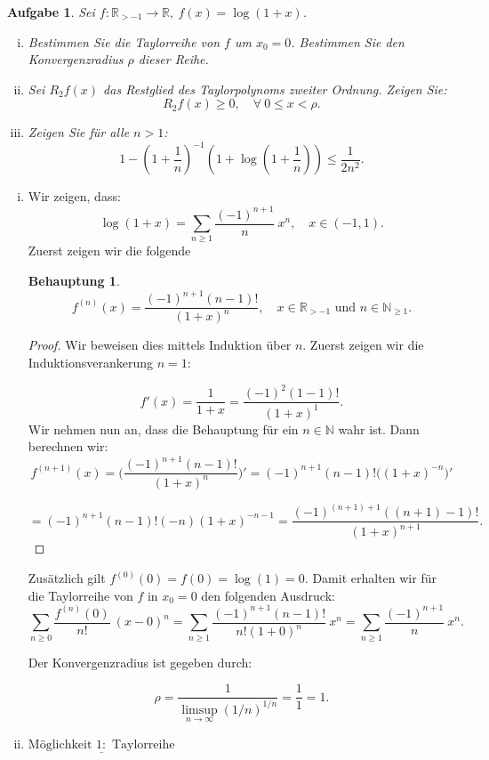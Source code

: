 \documentclass[a4paper, 20]{exam}
\newtheorem{ex}{Aufgabe}
\newtheorem{claim}{Behauptung}
\newcommand\RR{\mathbb{R}}
\newcommand\NN{\mathbb{N}}
\begin{document}
\begin{ex}
Sei $f:\RR_{> -1} \longrightarrow \RR, \ f(x)=\log(1+x)$.
\begin{enumerate}[i.)]
\item
Bestimmen Sie die Taylorreihe von $f$ um $x_0=0$. Bestimmen Sie den Konvergenzradius $\rho$ dieser Reihe.
\item
Sei $R_2 f(x)$ das Restglied des Taylorpolynoms zweiter Ordnung. Zeigen Sie:
$$ R_2 f(x) \geq 0, \quad \forall \ 0\leq x < \rho. $$
\item
Zeigen Sie f\"ur alle $n>1$:
$$ 1 - \left(1+\frac{1}{n}\right)^{-1}\left(1+ \log\left(1+\frac{1}{n}\right)\right) \leq \frac{1}{2n^2}.$$
\end{enumerate}
\end{ex}
\begin{solution}
\begin{enumerate}[i.)]
\item
Wir zeigen, dass:
$$ \log(1+x)= \sum_{n\geq 1} \frac{(-1)^{n+1}}{n} \ x^n, \quad x\in (-1,1).$$
Zuerst zeigen wir die folgende

\begin{claim}
$$f^{(n)}(x)= \frac{(-1)^{n+1}(n-1)!}{(1+x)^n}, \quad x\in \RR_{>-1} \text{ und } n \in \NN_{\geq 1}.$$
\end{claim}
\begin{proof}
Wir beweisen dies mittels Induktion \"uber $n$. Zuerst zeigen wir die Induktionsverankerung $n=1$:

$$ f'(x) = \frac{1}{1+x} = \frac{(-1)^2(1-1)!}{(1+x)^1}.$$
Wir nehmen nun an, dass die Behauptung f\"ur ein $n\in \NN$ wahr ist. Dann berechnen wir:
$$f^{(n+1)}(x)=  \bigg(\frac{(-1)^{n+1}(n-1)!}{(1+x)^n} \bigg)'
= (-1)^{n+1}(n-1)! \bigg((1+x)^{-n} \bigg)' $$

$$= (-1)^{n+1}(n-1)!(-n) (1+x)^{-n-1}
=\frac{(-1)^{(n+1)+1}((n+1)-1)!}{(1+x)^{n+1}}.$$
\end{proof}
Zus\"atzlich gilt $f^{(0)}(0)= f(0)= \log(1)=0$.
Damit erhalten wir f\"ur die Taylorreihe von $f$ in $x_0=0$ den folgenden Ausdruck:
$$ \sum_{n\geq 0} \frac{f^{(n)}(0)}{n!} \ (x-0)^n
= \sum_{n\geq 1} \frac{(-1)^{n+1}(n-1)!}{n!(1+0)^n} \ x^n 
= \sum_{n\geq 1} \frac{(-1)^{n+1}}{n} \ x^n.$$

Der Konvergenzradius ist gegeben durch:

$$ \rho = \frac{1}{\limsup_{n \rightarrow \infty} (1/n)^{1/n}} = \frac{1}{1}= 1.$$
\item
$\underline{\text{M\"oglichkeit } 1: \text{ Taylorreihe}}$


\end{enumerate}
\end{solution}
\end{document}
